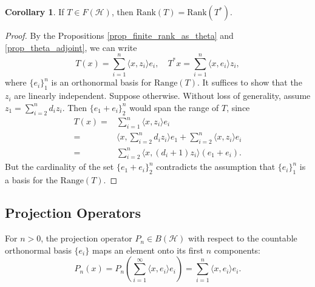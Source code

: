 \documentclass{dcthesis}
\numberwithin{equation}{section}
\numberwithin{equation}{section}
\theoremstyle{definition}
\newtheorem{corollary}[equation]{Corollary}
\begin{document}
\begin{corollary}
	If $T\in F(\mathcal{H})$, then $\text{Rank}(T) = \text{Rank}(T^\ast)$.
\end{corollary}
\begin{proof}
	By the Propositions \ref{prop_finite_rank_as_theta} and \ref{prop_theta_adjoint}, we can write 
	\begin{equation*}
		T(x)=\sum_{i=1}^n\langle x, z_i\rangle e_i,\quad T^\ast x=\sum_{i=1}^n\langle x, e_i\rangle z_i,
	\end{equation*}
	where $\{e_i\}_1^n$ is an orthonormal basis for $\text{Range}(T)$. It suffices to show that the $z_i$ are linearly independent. Suppose otherwise. Without loss of generality, assume $z_1=\sum_{i=2}^n d_iz_i$. Then $\{e_1+e_i\}_{2}^n$ would span the range of $T$, since
	\begin{align*}
		T(x) =& \sum_{i=1}^n \langle x, z_i \rangle e_i \\
		=& \langle x, \sum_{i=2}^n d_iz_i \rangle e_1 + \sum_{i=2}^n \langle x, z_i \rangle e_i \\
		=& \sum_{i=2}^n \langle x, (d_i+1)z_i\rangle (e_1 + e_i).
	\end{align*}
	But the cardinality of the set $\{e_1 + e_i\}_2^n$ contradicts the assumption that $\{e_i\}_{1}^n$ is a basis for the $\text{Range}(T)$.
\end{proof}


\subsection{Projection Operators} %

For $n>0$, the projection operator $P_n\in B(\mathcal{H})$ with respect to the countable orthonormal basis $\{e_i\}$ maps an element onto its first $n$ components: 
\begin{equation*}
	P_n(x)=P_n\left(\sum_{i=1}^\infty \langle x,e_i \rangle e_i\right) = \sum_{i=1}^n \langle x, e_i \rangle e_i.
\end{equation*} 
\end{document}
